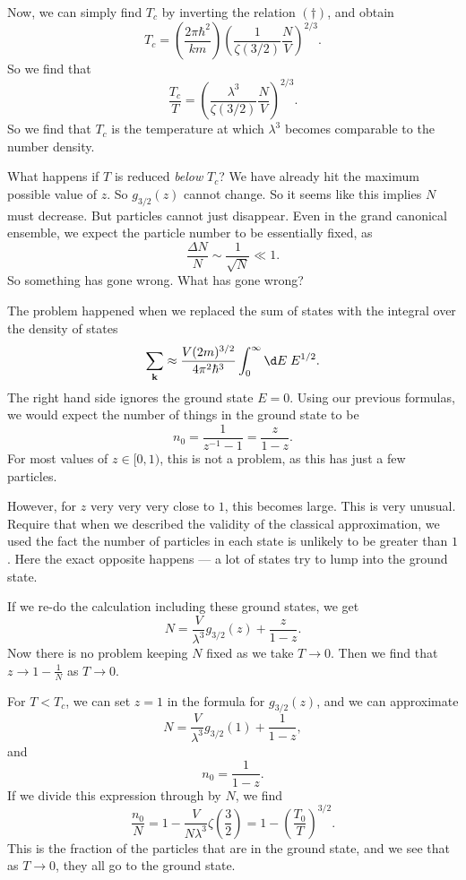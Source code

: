 \documentclass[a4paper]{article}
\begin{document}
Now, we can simply find $T_c$ by inverting the relation $(\dagger)$, and obtain
\[
  T_c = \left(\frac{2\pi \hbar^2}{k m}\right) \left(\frac{1}{\zeta(3/2)} \frac{N}{V}\right)^{2/3}. %
\]
So we find that
\[
  \frac{T_c}{T} = \left(\frac{\lambda^3}{\zeta(3/2)} \frac{N}{V}\right)^{2/3}.\tag{$**$}
\]
So we find that $T_c$ is the temperature at which $\lambda^3$ becomes comparable to the number density.

What happens if $T$ is reduced \emph{below} $T_c$? We have already hit the maximum possible value of $z$. So $g_{3/2}(z)$ cannot change. So it seems like this implies $N$ must decrease. But particles cannot just disappear. Even in the grand canonical ensemble, we expect the particle number to be essentially fixed, as
\[
  \frac{\Delta N}{N} \sim \frac{1}{\sqrt{N}} \ll 1.
\]
So something has gone wrong. What has gone wrong?

The problem happened when we replaced the sum of states with the integral over the density of states
\[
  \sum_\mathbf{k} \approx \frac{V(2m)^{3/2}}{4\pi^2 \hbar^3} \int_0^\infty \d E\; E^{1/2}.
\]
The right hand side ignores the ground state $E = 0$. Using our previous formulas, we would expect the number of things in the ground state to be
\[
  n_0 = \frac{1}{z^{-1} - 1} = \frac{z}{1 - z}.
\]
For most values of $z \in [0, 1)$, this is not a problem, as this has just a few particles.

However, for $z$ very very very close to $1$, this becomes large. This is very unusual. Require that when we described the validity of the classical approximation, we used the fact the number of particles in each state is unlikely to be greater than $1$. Here the exact opposite happens --- a lot of states try to lump into the ground state.

If we re-do the calculation including these ground states, we get
\[
  N = \frac{V}{\lambda^3} g_{3/2}(z) + \frac{z}{1 - z}.
\]
Now there is no problem keeping $N$ fixed as we take $T \to 0$. Then we find that $z \to 1 - \frac{1}{N}$ as $T \to 0$.

For $T < T_c$, we can set $z = 1$ in the formula for $g_{3/2}(z)$, and we can approximate
\[
  N = \frac{V}{\lambda^3} g_{3/2}(1) + \frac{1}{1 - z},
\]
and
\[
  n_0 = \frac{1}{1 - z}.
\]
If we divide this expression through by $N$, we find
\[
  \frac{n_0}{N} = 1 - \frac{V}{N \lambda^3} \zeta\left(\frac{3}{2}\right) = 1 - \left(\frac{T_0}{T}\right)^{3/2}.
\]
This is the fraction of the particles that are in the ground state, and we see that as $T \to 0$, they all go to the ground state.
\end{document}
